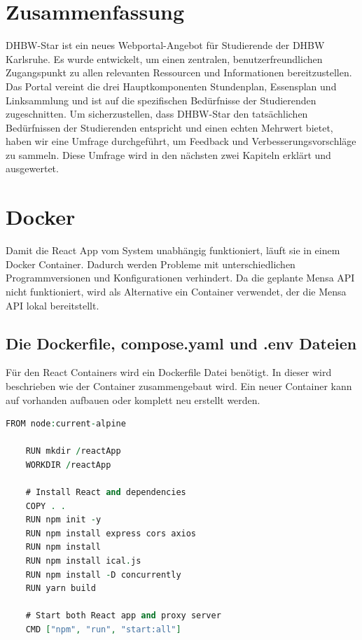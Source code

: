 \section{Zusammenfassung}
DHBW-Star ist ein  neues Webportal-Angebot für Studierende der DHBW Karlsruhe. Es wurde  entwickelt, um einen zentralen, benutzerfreundlichen Zugangspunkt zu allen relevanten Ressourcen und Informationen bereitzustellen. Das Portal vereint die drei Hauptkomponenten Stundenplan, Essensplan und Linksammlung und ist auf die spezifischen Bedürfnisse der Studierenden zugeschnitten. 
Um sicherzustellen, dass DHBW-Star den tatsächlichen Bedürfnissen der Studierenden entspricht und einen echten Mehrwert bietet, haben wir eine Umfrage durchgeführt, um Feedback und Verbesserungsvorschläge zu sammeln.
Diese Umfrage wird in den nächsten zwei Kapiteln erklärt und ausgewertet.
\newpage
\section{Docker}

Damit die React App vom System unabhängig funktioniert, läuft sie in einem Docker Container. Dadurch werden Probleme mit unterschiedlichen Programmversionen und Konfigurationen verhindert.
Da die geplante Mensa API nicht funktioniert, wird als Alternative ein Container verwendet, der die Mensa API lokal bereitstellt.

\subsection{Die Dockerfile, compose.yaml und .env Dateien}

Für den React Containers wird ein Dockerfile Datei benötigt. In dieser wird beschrieben wie der Container zusammengebaut wird. Ein neuer Container kann auf vorhanden aufbauen oder komplett neu erstellt werden.

\begin{lstlisting}[language=vhdl,
	frame=single,           % Ein Rahmen um den Code
	framexleftmargin=15pt,  % Rahmen link von den Zahlen
	style=algoBericht,
	label={Dockerfile},
	captionpos=b           % Caption unter den Code setzen
	caption={Dockerfile für DHBW-Star}]
	FROM node:current-alpine
	
	RUN mkdir /reactApp
	WORKDIR /reactApp
	
	# Install React and dependencies
	COPY . .
	RUN npm init -y
	RUN npm install express cors axios
	RUN npm install
	RUN npm install ical.js
	RUN npm install -D concurrently
	RUN yarn build
	
	# Start both React app and proxy server
	CMD ["npm", "run", "start:all"]
\end{lstlisting}


